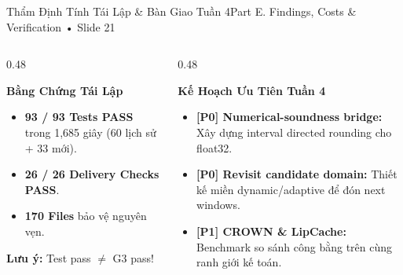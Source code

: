 \documentclass[aspectratio=169, 10pt]{beamer}
\begin{document}
\begin{frame}{Thẩm Định Tính Tái Lập \& Bàn Giao Tuần 4}{Part E. Findings, Costs \& Verification • Slide 21}
    \begin{columns}
        \begin{column}{0.48\textwidth}
            \begin{block}{\textbf{Bằng Chứng Tái Lập}}
                \footnotesize
                \begin{itemize}
                    \item \textbf{93 / 93 Tests PASS} trong 1,685 giây (60 lịch sử + 33 mới).
                    \item \textbf{26 / 26 Delivery Checks PASS}.
                    \item \textbf{170 Files} bảo vệ nguyên vẹn.
                \end{itemize}
            \end{block}
            \alert{\textbf{Lưu ý:}} Test pass $\neq$ G3 pass!
        \end{column}
        \begin{column}{0.48\textwidth}
            \begin{block}{\textbf{Kế Hoạch Ưu Tiên Tuần 4}}
                \footnotesize
                \begin{itemize}
                    \item \textbf{[P0] Numerical-soundness bridge:} Xây dựng interval directed rounding cho float32.
                    \item \textbf{[P0] Revisit candidate domain:} Thiết kế miền dynamic/adaptive để đón next windows.
                    \item \textbf{[P1] CROWN \& LipCache:} Benchmark so sánh công bằng trên cùng ranh giới kế toán.
                \end{itemize}
            \end{block}
        \end{column}
    \end{columns}
\end{frame}
\end{document}
